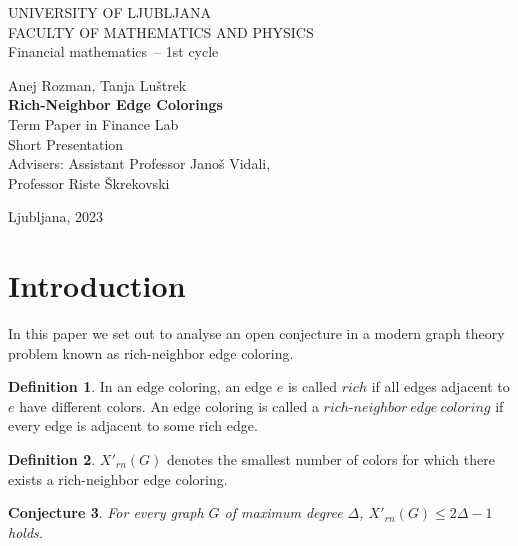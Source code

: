 \documentclass[12pt,a4paper]{amsart}
\theoremstyle{definition} %
\newtheorem{definicija}{Definition}[section]
\theoremstyle{plain} %
\newtheorem{conjecture}[definicija]{Conjecture}
\newcommand{\program}{Financial mathematics} %
\newcommand{\imeavtorja}{Anej Rozman, Tanja Luštrek} %
\newcommand{\imementorja}{Assistant Professor Janoš Vidali} %
\newcommand{\imesomentorja}{Professor Riste Škrekovski}
\newcommand{\naslovdela}{Rich-Neighbor Edge Colorings}
\newcommand{\letnica}{2023} %
\begin{document}
\thispagestyle{empty}
{\large
\noindent UNIVERSITY OF LJUBLJANA\\[1mm]
FACULTY OF MATHEMATICS AND PHYSICS\\[5mm]
\program\ -- 1st cycle}
\vfill

\begin{center}{\large
\imeavtorja\\[2mm]
{\bf \naslovdela}\\[10mm]
Term Paper in Finance Lab\\[2mm]
Short Presentation\\[1cm]
Advisers: \imementorja, \\ \imesomentorja\\[2mm]}
\end{center}
\vfill

{\large
Ljubljana, \letnica}
\pagebreak

\section{Introduction}

In this paper we set out to analyse an open conjecture in a modern graph theory problem known as rich-neighbor edge coloring.

\begin{definicija}
    In an edge coloring, an edge $e$ is called $rich$ if all edges adjacent to $e$ have different colors. An edge coloring is 
    called a $rich\text{-}neighbor \ edge \ coloring$ if every edge is adjacent to some rich edge.
\end{definicija}

\begin{definicija}
    $X'_{rn}(G)$ denotes the smallest number of colors for which there exists a rich-neighbor edge coloring.
\end{definicija}

\begin{conjecture}
    For every graph $G$ of maximum degree $\Delta$, $X'_{rn}(G) \leq 2\Delta - 1$ holds.
\end{conjecture}
\end{document}
